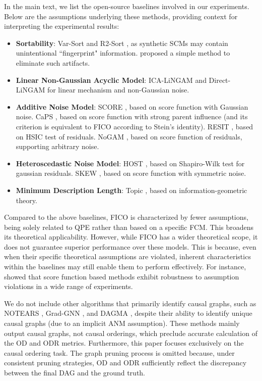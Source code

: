\documentclass{article}
\theoremstyle{plain}
\theoremstyle{definition}
\theoremstyle{remark}
\begin{document}
In the main text, we list the open-source baselines involved in our experiments. Below are the assumptions underlying these methods, providing context for interpreting the experimental results:
\begin{itemize}[leftmargin=*]
\itemsep0em
\item \textbf{Sortability}: Var-Sort \citep{Reisach2021} and R2-Sort \citep{Reisach2023}, as synthetic SCMs may contain unintentional ``fingerprint" information. \citet{Ormaniec2025} proposed a simple method to eliminate such artifacts.
\item \textbf{Linear Non-Gaussian Acyclic Model}: ICA-LiNGAM \citep{Shimizu2006} and Direct-LiNGAM \citep{Shimizu2011} for linear mechanism and non-Gaussian noise.
\item \textbf{Additive Noise Model}: SCORE \citep{Rolland2022}, based on score function with Gaussian noise. CaPS \citep{Xu2024}, based on score function with strong parent influence (and its criterion is equivalent to FICO according to Stein's identity). RESIT \citep{Peters2014}, based on HSIC test of residuals. NoGAM \citep{Montagna2023}, based on score function of residuals, supporting arbitrary noise.
\item \textbf{Heteroscedastic Noise Model}: HOST \citep{Duong2023}, based on Shapiro-Wilk test for gaussian residuals. SKEW \citep{Lin2025}, based on score function with symmetric noise.
\item \textbf{Minimum Description Length}: Topic \citep{Xu2025}, based on information-geometric theory.
\end{itemize}

Compared to the above baselines, FICO is characterized by fewer assumptions, being solely related to QPE rather than based on a specific FCM. This broadens its theoretical applicability. However, while FICO has a wider theoretical scope, it does not guarantee superior performance over these models. This is because, even when their specific theoretical assumptions are violated, inherent characteristics within the baselines may still enable them to perform effectively. For instance, \citet{Montagna2023} showed that score function based methods exhibit robustness to assumption violations in a wide range of experiments.

We do not include other algorithms that primarily identify causal graphs, such as NOTEARS \citep{Zheng2018}, Grad-GNN \citep{Yu2019}, and DAGMA \cite{Bello2022}, despite their ability to identify unique causal graphs (due to an implicit ANM assumption). These methods mainly output causal graphs, not causal orderings, which preclude accurate calculation of the OD and ODR metrics. Furthermore, this paper focuses exclusively on the causal ordering task. The graph pruning process is omitted because, under consistent pruning strategies, OD and ODR sufficiently reflect the discrepancy between the final DAG and the ground truth.
\end{document}
